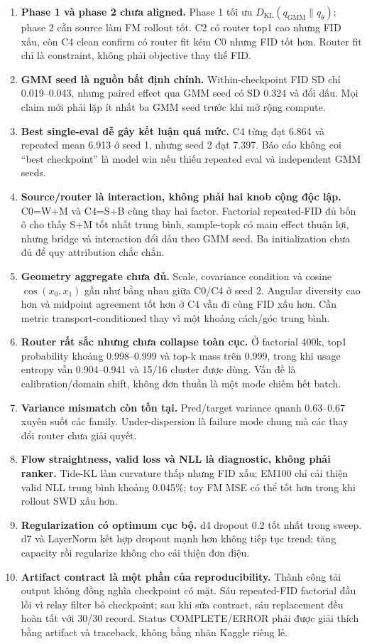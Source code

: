 \documentclass[11pt,a4paper]{article}
\newcommand{\kl}{D_{\mathrm{KL}}}
\begin{document}
\begin{enumerate}
  \item \textbf{Phase 1 và phase 2 chưa aligned.} Phase 1 tối ưu \(\kl(q_{\mathrm{GMM}}\|q_\theta)\); phase 2 cần source làm FM rollout tốt. C2 có router top1 cao nhưng FID xấu, còn C4 clean confirm có router fit kém C0 nhưng FID tốt hơn. Router fit chỉ là constraint, không phải objective thay thế FID.
  \item \textbf{GMM seed là nguồn bất định chính.} Within-checkpoint FID SD chỉ 0.019--0.043, nhưng paired effect qua GMM seed có SD 0.324 và đổi dấu. Mọi claim mới phải lặp ít nhất ba GMM seed trước khi mở rộng compute.
  \item \textbf{Best single-eval dễ gây kết luận quá mức.} C4 từng đạt 6.864 và repeated mean 6.913 ở seed 1, nhưng seed 2 đạt 7.397. Báo cáo không coi ``best checkpoint'' là model win nếu thiếu repeated eval và independent GMM seeds.
  \item \textbf{Source/router là interaction, không phải hai knob cộng độc lập.} C0=W+M và C4=S+B cùng thay hai factor. Factorial repeated-FID đủ bốn ô cho thấy S+M tốt nhất trung bình, sample-topk có main effect thuận lợi, nhưng bridge và interaction đổi dấu theo GMM seed. Ba initialization chưa đủ để quy attribution chắc chắn.
  \item \textbf{Geometry aggregate chưa đủ.} Scale, covariance condition và cosine \(\cos(x_0,x_1)\) gần như bằng nhau giữa C0/C4 ở seed 2. Angular diversity cao hơn và midpoint agreement tốt hơn ở C4 vẫn đi cùng FID xấu hơn. Cần metric transport-conditioned thay vì một khoảng cách/góc trung bình.
  \item \textbf{Router rất sắc nhưng chưa collapse toàn cục.} Ở factorial 400k, top1 probability khoảng 0.998--0.999 và top-k mass trên 0.999, trong khi usage entropy vẫn 0.904--0.941 và 15/16 cluster được dùng. Vấn đề là calibration/domain shift, không đơn thuần là một mode chiếm hết batch.
  \item \textbf{Variance mismatch còn tồn tại.} Pred/target variance quanh 0.63--0.67 xuyên suốt các family. Under-dispersion là failure mode chung mà các thay đổi router chưa giải quyết.
  \item \textbf{Flow straightness, valid loss và NLL là diagnostic, không phải ranker.} Tide-KL làm curvature thấp nhưng FID xấu; EM100 chỉ cải thiện valid NLL trung bình khoảng 0.045\%; toy FM MSE có thể tốt hơn trong khi rollout SWD xấu hơn.
  \item \textbf{Regularization có optimum cục bộ.} d4 dropout 0.2 tốt nhất trong sweep. d7 và LayerNorm kết hợp dropout mạnh hơn không tiếp tục trend; tăng capacity rồi regularize không cho cải thiện đơn điệu.
  \item \textbf{Artifact contract là một phần của reproducibility.} Thành công tải output không đồng nghĩa checkpoint có mặt. Sáu repeated-FID factorial đầu lỗi vì relay filter bỏ checkpoint; sau khi sửa contract, sáu replacement đều hoàn tất với 30/30 record. Status COMPLETE/ERROR phải được giải thích bằng artifact và traceback, không bằng nhãn Kaggle riêng lẻ.
\end{enumerate}
\end{document}
